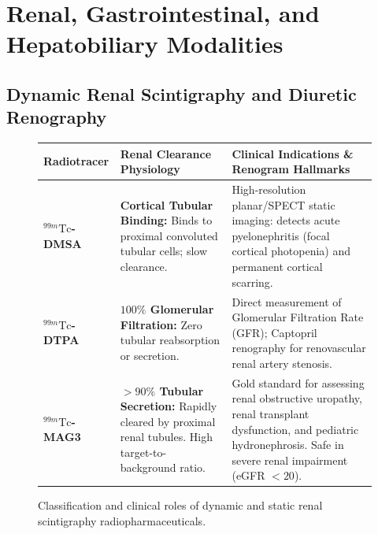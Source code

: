 \documentclass[11pt,a4paper]{article}
\begin{document}
\newpage
\section{Renal, Gastrointestinal, and Hepatobiliary Modalities}

\subsection{Dynamic Renal Scintigraphy and Diuretic Renography}

\begin{figure}[htbp]
\centering
\setlength{\tabcolsep}{4pt}
\begin{tabular}{p{3.2cm}p{3.8cm}p{7.4cm}}
\toprule
\textbf{Radiotracer} & \textbf{Renal Clearance Physiology} & \textbf{Clinical Indications \& Renogram Hallmarks} \\
\midrule
\textbf{$^{99m}\text{Tc}$-DMSA} & \textbf{Cortical Tubular Binding:} Binds to proximal convoluted tubular cells; slow clearance. & High-resolution planar/SPECT static imaging: detects acute pyelonephritis (focal cortical photopenia) and permanent cortical scarring. \\
\addlinespace
\textbf{$^{99m}\text{Tc}$-DTPA} & \textbf{$100\%$ Glomerular Filtration:} Zero tubular reabsorption or secretion. & Direct measurement of Glomerular Filtration Rate (GFR); Captopril renography for renovascular renal artery stenosis. \\
\addlinespace
\textbf{$^{99m}\text{Tc}$-MAG3} & \textbf{$> 90\%$ Tubular Secretion:} Rapidly cleared by proximal renal tubules. High target-to-background ratio. & Gold standard for assessing renal obstructive uropathy, renal transplant dysfunction, and pediatric hydronephrosis. Safe in severe renal impairment (eGFR $< 20$). \\
\bottomrule
\end{tabular}
\caption{Classification and clinical roles of dynamic and static renal scintigraphy radiopharmaceuticals.}
\label{tab:renal_radiotracers}
\end{figure}
\end{document}
